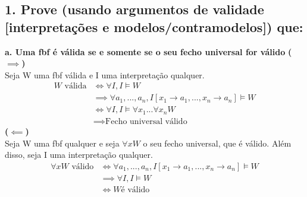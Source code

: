 \subsection*{1. Prove (usando argumentos de validade [interpretações e modelos/contramodelos]) que:}

\textbf{a. Uma fbf é válida se e somente se o seu fecho universal for válido}
\textbf{($\implies$)}
\\
Seja W uma fbf válida e I uma interpretação qualquer. 
\begin{align*}
    W \text{ válida} 
    &\Longleftrightarrow \forall I, I  \models W \tag*{(Def. Val.)} \\
    &\implies \forall a_1,...,a_n,I[x_1\rightarrow a_1,...,x_n \rightarrow a_n] \models W \tag*{(Semântica $\forall x)$} \\
    &\Longleftrightarrow \forall I, I \models \forall x_1 ... \forall x_n W \tag*{(Def. fecho universal)} \\
    &\implies \text{Fecho universal válido}
\end{align*}
\textbf{($\impliedby$)}
\\
Seja W uma fbf qualquer e seja $\forall xW$ o seu fecho universal, que é válido. Além disso, seja I uma interpretação qualquer. 
\begin{align*}
    \forall x W  \text{ válido} &\Longleftrightarrow \forall a_1,...,a_n,I[x_1\rightarrow a_1,...,x_n \rightarrow a_n] \models W \tag*{(Def.)} \\
    &\implies \forall I, I \models W \tag*{(Semântica $\forall x$)}\\
    &\Longleftrightarrow W \text{é válido} \tag*{(Def. Val.)}
\end{align*} 
